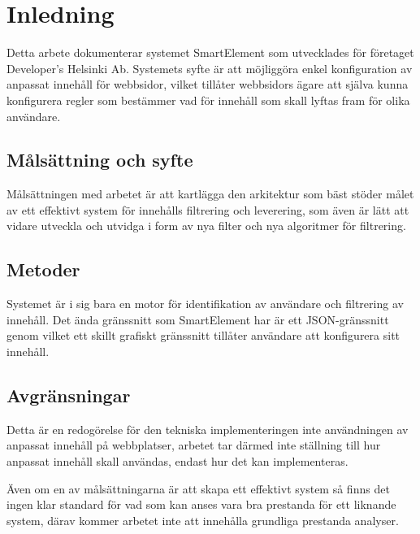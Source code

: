 \section{Inledning}

Detta arbete dokumenterar systemet SmartElement som utvecklades för företaget Developer’s Helsinki Ab. Systemets syfte är att möjliggöra enkel konfiguration av anpassat innehåll för webbsidor, vilket tillåter webbsidors ägare att själva kunna konfigurera regler som bestämmer vad för innehåll som skall lyftas fram för olika användare.

\subsection{Målsättning och syfte}

Målsättningen med arbetet är att kartlägga den arkitektur som bäst stöder målet av ett effektivt system för innehålls filtrering och leverering, som även är lätt att vidare utveckla och utvidga i form av nya filter och nya algoritmer för filtrering.



\subsection{Metoder}

Systemet är i sig bara en motor för identifikation av användare och filtrering av innehåll. Det ända gränssnitt som SmartElement har är ett JSON-gränssnitt genom vilket ett skillt grafiskt gränssnitt tillåter användare att konfigurera sitt innehåll.

\subsection{Avgränsningar}

Detta är en redogörelse för den tekniska implementeringen inte användningen av anpassat innehåll på webbplatser, arbetet tar därmed inte ställning till hur anpassat innehåll skall användas, endast hur det kan implementeras.

Även om en av målsättningarna är att skapa ett effektivt system så finns det ingen klar standard för vad som kan anses vara bra prestanda för ett liknande system, därav kommer arbetet inte att innehålla grundliga prestanda analyser.

